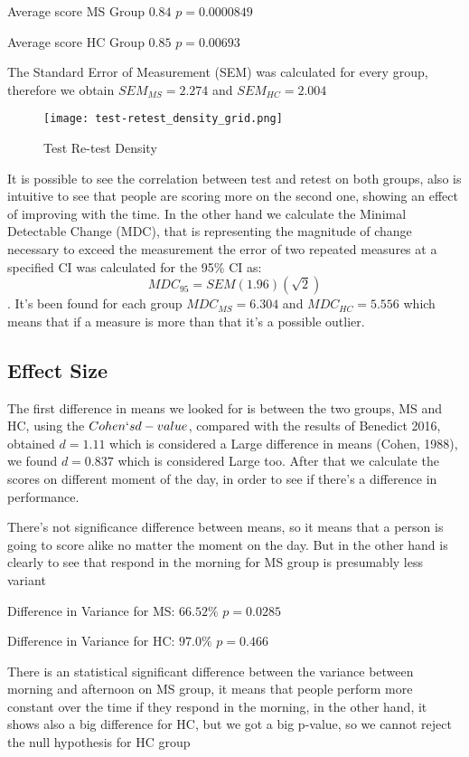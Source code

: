 \documentclass[letterpaper, 10 pt, conference]{ieeeconf}
\begin{document}
Average score MS Group $0.84$ $p=0.0000849$ 

Average score HC Group $0.85$ $p=0.00693$ 

The Standard Error of Measurement (SEM) was calculated for every group, therefore we obtain $SEM_{MS}=2.274$ and $SEM_{HC}=2.004$

\begin{figure}[ht]
\texttt{[image: test-retest\_density\_grid.png]}
\caption{Test Re-test Density}
\label{tab:density}
\end{figure}

It is possible to see the correlation between test and retest on both groups, also is intuitive to see that people are scoring more on the second one, showing an effect of improving with the time. In the other hand we calculate the Minimal Detectable Change (MDC), that is representing the magnitude of change necessary to exceed the measurement the error of two repeated measures at a specified CI was calculated for the 95\% CI as:
$$MDC_{95} = SEM( 1.96 )(\sqrt{2})$$. It's been found for each group $MDC_{MS}= 6.304$ and $MDC_{HC}=5.556$ which means that if a measure is more than that it's a possible outlier.

\subsection{Effect Size}
\vspace{2mm}

The first difference in means we looked for is between the two groups, MS and HC, using the $Cohen`s d-value$, compared with the results of Benedict 2016, obtained $d=1.11$ which is considered a Large difference in means (Cohen, 1988), we found  $d=0.837$ which is considered Large too. After that we calculate the scores on different moment of the day, in order to see if there's a difference in performance.



There's not significance difference between means, so it means that a person is going to score alike no matter the moment on the day. But in the other hand is clearly to see that respond in the morning for MS group is presumably less variant

Difference in Variance for MS: $66.52\%$  $p=0.0285$

Difference in Variance for HC: $97.0\%$  $p=0.466$

There is an statistical significant difference between the variance between morning and afternoon on MS group, it means that people perform more constant over the time if they respond in the morning, in the other hand, it shows also a big difference for HC, but we got a big p-value, so we cannot reject the null hypothesis for HC group
\end{document}
